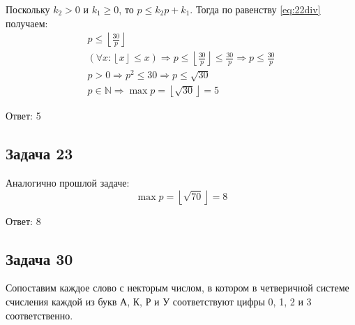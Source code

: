 Поскольку $ k_2 > 0 $ и $ k_1 \ge 0 $, то $ p \le k_2p + k_1 $. 
Тогда по равенству \eqref{eq:22div} получаем: 
\begin{equation*}
  \begin{gathered}
    p \le \left\lfloor \frac{30}{p} \right\rfloor \\
    (\forall x: \left\lfloor x \right\rfloor \le x) \Rightarrow p \le \left\lfloor \frac{30}{p} \right\rfloor \le \frac{30}{p}
    \Rightarrow p \le \frac{30}{p} \\
    p > 0 \Rightarrow p^2 \le 30 \Rightarrow p \le \sqrt{30} \\
    p \in \mathbb N \Rightarrow \max p = \left\lfloor \sqrt{30} \right\rfloor = 5
  \end{gathered}
\end{equation*}

Ответ: 5

\subsection{Задача 23}
Аналогично прошлой задаче:
\begin{equation*}
  \max p = \left\lfloor \sqrt{70} \right\rfloor = 8
\end{equation*}

Ответ: 8

\subsection{Задача 30}
Сопоставим каждое слово с некторым числом, в котором в четверичной системе 
счисления каждой из букв А, К, Р и У соответствуют цифры 0, 1, 2 и 3
соответственно.

